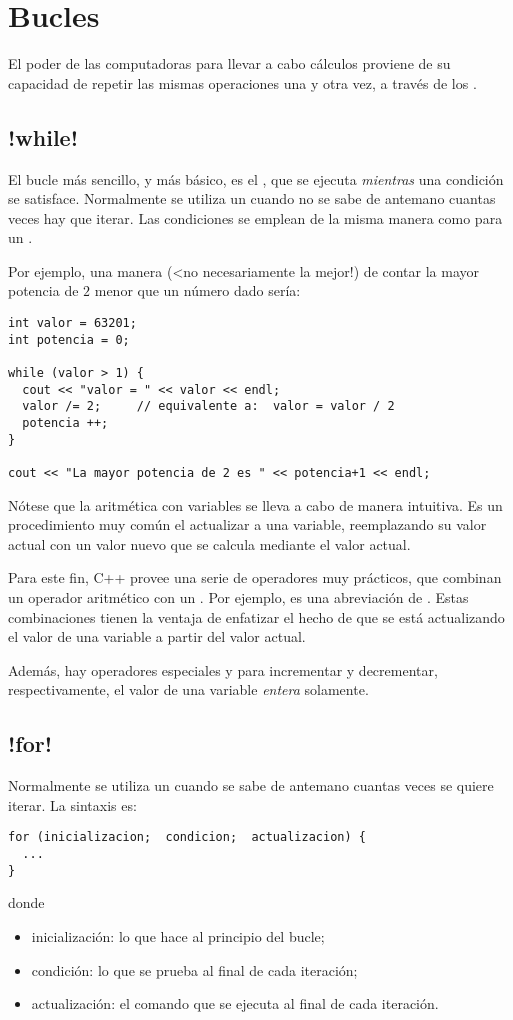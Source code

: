 \section{Bucles}

El poder de las computadoras para llevar a cabo cálculos proviene de su
capacidad de repetir las mismas operaciones una y otra vez, a través de los
.

\subsection{\inl!while!}

El bucle más sencillo, y más básico, es el , que se ejecuta
\emph{mientras} una
condición se satisface.  Normalmente se utiliza un  cuando no se
sabe de antemano
cuantas veces hay que iterar.  Las condiciones se emplean de la misma manera
como para un .

Por ejemplo, una manera (<no necesariamente la mejor!) de contar la mayor
potencia de $2$ menor que un número dado sería:
\begin{lstlisting}
int valor = 63201;
int potencia = 0;

while (valor > 1) {
  cout << "valor = " << valor << endl;
  valor /= 2;     // equivalente a:  valor = valor / 2
  potencia ++;
}

cout << "La mayor potencia de 2 es " << potencia+1 << endl;
\end{lstlisting}
Nótese que la aritmética con variables se lleva a cabo de manera intuitiva.
Es un procedimiento muy común el actualizar a una variable, reemplazando su
valor actual con un valor nuevo que se calcula mediante el valor actual.

Para este fin, C++ provee una serie de operadores muy prácticos, que combinan
un operador aritmético con un \inl{=}. Por ejemplo,  es una
abreviación de . Estas combinaciones tienen la ventaja de
enfatizar el hecho de que se está actualizando el valor de una variable a partir
del valor actual.

Además, hay operadores especiales \inl{++} y \inl{--} para incrementar y
decrementar, respectivamente, el valor de una variable \emph{entera} solamente.


\subsection{\inl!for!}

Normalmente se utiliza un  cuando se sabe de antemano cuantas
veces se quiere iterar.  La sintaxis es:
\begin{lstlisting}
for (inicializacion;  condicion;  actualizacion) {
  ...
}
\end{lstlisting}
donde
\begin{itemize}
\item inicialización: lo que hace al principio del bucle;
\item condición: lo que se prueba al final de cada iteración;
\item actualización: el comando que se ejecuta al final de cada iteración.
\end{itemize}

